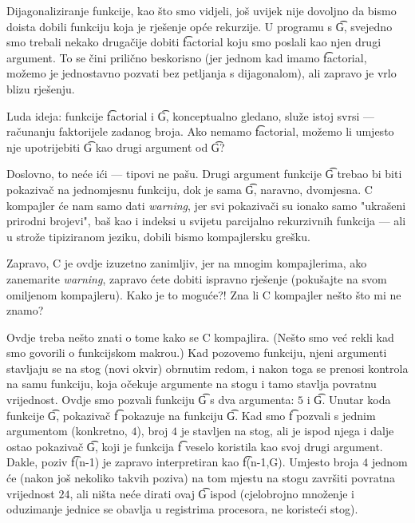 
Dijagonaliziranje funkcije, kao što smo vidjeli, još uvijek nije dovoljno da bismo doista dobili funkciju koja je rješenje opće rekurzije. U programu s \t{G}, svejedno smo trebali nekako drugačije dobiti \t{factorial} koju smo poslali kao njen drugi argument. To se čini prilično beskorisno (jer jednom kad imamo \t{factorial}, možemo je jednostavno pozvati bez petljanja s dijagonalom), ali zapravo je vrlo blizu rješenju.

Luda ideja: funkcije \t{factorial} i \t{G}, konceptualno gledano, služe istoj svrsi --- računanju faktorijele zadanog broja. Ako nemamo \t{factorial}, možemo li umjesto nje upotrijebiti \t{G} kao drugi argument od \t{G}?

Doslovno, to neće ići --- tipovi ne pašu. Drugi argument funkcije \t{G} trebao bi biti pokazivač na jednomjesnu funkciju, dok je sama \t{G}, naravno, dvomjesna. C kompajler će nam samo dati \emph{warning}, jer svi pokazivači su ionako samo "ukrašeni prirodni brojevi", baš kao i indeksi u svijetu parcijalno rekurzivnih funkcija --- ali u strože tipiziranom jeziku, dobili bismo kompajlersku grešku.

Zapravo, C je ovdje izuzetno zanimljiv, jer na mnogim kompajlerima, ako zanemarite \emph{warning}, zapravo ćete dobiti ispravno rješenje (pokušajte na svom omiljenom kompajleru). Kako je to moguće?! Zna li C kompajler nešto što mi ne znamo?

Ovdje treba nešto znati o tome kako se C kompajlira. (Nešto smo već rekli kad smo govorili o funkcijskom makrou.) Kad pozovemo funkciju, njeni argumenti stavljaju se na stog (novi okvir) obrnutim redom, i nakon toga se prenosi kontrola na samu funkciju, koja očekuje argumente na stogu i tamo stavlja povratnu vrijednost. Ovdje smo pozvali funkciju \t{G} s dva argumenta: $5$ i \t{G}. Unutar koda funkcije \t{G}, pokazivač \t f pokazuje na funkciju \t{G}. Kad smo \t f pozvali s jednim argumentom (konkretno, $4$), broj $4$ je stavljen na stog, ali je ispod njega i dalje ostao pokazivač \t{G}, koji je funkcija \t f veselo koristila kao svoj drugi argument. Dakle, poziv \t{f(n-1)} je zapravo interpretiran kao \t{f(n-1,G)}. Umjesto broja $4$ jednom će (nakon još nekoliko takvih poziva) na tom mjestu na stogu završiti povratna vrijednost $24$, ali ništa neće dirati ovaj \t{G} ispod (cjelobrojno množenje i oduzimanje jednice se obavlja u registrima procesora, ne koristeći stog).


